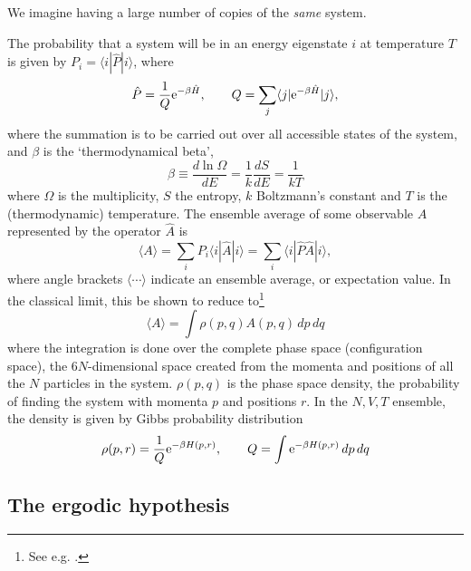 \documentclass[11pt,bibliography=totoc,index=totoc]{scrbook}   %
\begin{document}
We imagine having a large number of copies of the \emph{same} system. 


The probability that a system will be in an energy eigenstate $i$ at temperature $T$ is 
given by $P_i=\langle i | \hat{P} | i \rangle$, where
\begin{equation}
  \hat{P} = \frac{1}{Q} \mathrm{e}^{-\beta\hat{H}}, \qquad Q = \sum_j \langle j | \mathrm{e}^{-\beta\hat{H}} | j \rangle,
\end{equation}
where the summation is to be carried out over all accessible states of the system, and
$\beta$ is the `thermodynamical beta',
\begin{equation}
  \beta \equiv \frac{d\ln\Omega}{dE} = \frac{1}{k}\frac{dS}{dE} = \frac{1}{kT}
\end{equation}
where $\Omega$ is the multiplicity, $S$ the entropy, $k$ Boltzmann's constant and $T$ is the (thermodynamic) temperature. 
The ensemble average of some observable $A$ represented by the operator $\hat{A}$ is
\begin{equation}
  \langle A \rangle = \sum_i P_i \langle i | \hat{A} | i\rangle = \sum_i \langle i | \hat{P} \hat{A} | i \rangle,
\end{equation}
where angle brackets $\langle \cdots \rangle$ indicate an ensemble average, or expectation value.
In the classical limit, this be shown to reduce to\footnote{See e.g. \cite[13-15]{Frenkel:1996}.}
\begin{equation}
  \langle A \rangle = \int \rho(p,q) A(p,q)\,dp\,dq 
  \label{eq:configuration-int}
\end{equation}
where the integration is done over the complete phase space (configuration space), the $6N$-dimensional space created from the momenta and positions of all the $N$ particles in the system. $\rho(p,q)$ is the phase space density, the probability of finding the system with momenta $p$ and positions $r$. In the $N,V,T$ ensemble, the density is given by Gibbs probability distribution
\begin{equation}
  \rho(p,r) = \frac{1}{Q} \mathrm{e}^{-\beta H(p,r)},\qquad Q = \int \mathrm{e}^{-\beta H(p,r)} \,dp\,dq
\end{equation}

%
\subsection{The ergodic hypothesis}\label{sec:ergodic-hypothesis}
%
\end{document}
